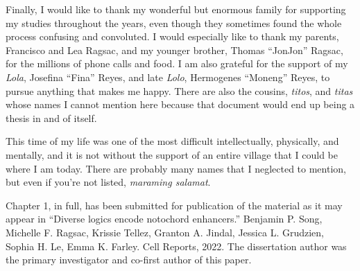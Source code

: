 \documentclass[11pt]{formatting-template}
\begin{document}
\begin{acknowledgements}
	Finally, I would like to thank my wonderful but enormous family for supporting my studies throughout the years, even though they sometimes found the whole process confusing and convoluted. I would especially like to thank my parents, Francisco and Lea Ragsac, and my younger brother, Thomas “JonJon” Ragsac, for the millions of phone calls and food. I am also grateful for the support of my \textit{Lola}, Josefina “Fina” Reyes, and late \textit{Lolo}, Hermogenes “Moneng” Reyes, to pursue anything that makes me happy. There are also the cousins, \textit{titos}, and \textit{titas} whose names I cannot mention here because that document would end up being a thesis in and of itself. 
	
	This time of my life was one of the most difficult intellectually, physically, and mentally, and it is not without the support of an entire village that I could be where I am today. There are probably many names that I neglected to mention, but even if you’re not listed, \textit{maraming salamat}.
	
	Chapter 1, in full, has been submitted for publication of the material as it may appear in “Diverse logics encode notochord enhancers.” Benjamin P. Song, Michelle F. Ragsac, Krissie Tellez, Granton A. Jindal, Jessica L. Grudzien, Sophia H. Le, Emma K. Farley. Cell Reports, 2022. The dissertation author was the primary investigator and co-first author of this paper.
\end{acknowledgements}
\end{document}
